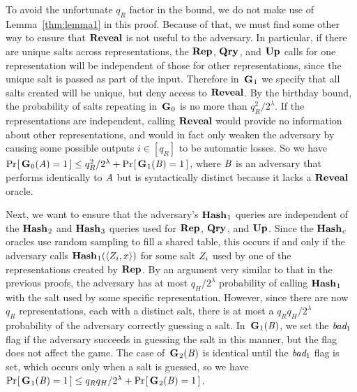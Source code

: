 To avoid the unfortunate $q_R$ factor in the bound, we do not make use of Lemma~\ref{thm:lemma1} in this proof. Because of that, we must find some other way to ensure that $\mathbf{Reveal}$ is not useful to the adversary. In particular, if there are unique salts across representations, the $\textup{\textbf{Rep}}\hspace{0.5pt}$, $\textup{\textbf{Qry}}\hspace{0.5pt}$, and $\textup{\textbf{Up}}\hspace{0.5pt}$ calls for one representation will be independent of those for other representations, since the unique salt is passed as part of the input. Therefore in~$\textup{\textbf{G}}\hspace{0.5pt}_1$ we specify that all salts created will be unique, but deny access to $\mathbf{Reveal}$. By the birthday bound, the probability of salts repeating in~$\textup{\textbf{G}}\hspace{0.5pt}_0$ is no more than $q_R^2/2^\lambda$. If the representations are independent, calling $\mathbf{Reveal}$ would provide no information about other representations, and would in fact only weaken the adversary by causing some possible outputs $i \in [q_R]$ to be automatic losses. So we have $\Pr\hspace{-1pt}\left[\,\textup{\textbf{G}}\hspace{0.5pt}_0(\mathit{A}) = 1\,\right] \le q_R^2/2^\lambda + \Pr\hspace{-1pt}\left[\,\textup{\textbf{G}}\hspace{0.5pt}_1(\mathit{B}) = 1\,\right]$, where $\mathit{B}$ is an adversary that performs identically to $\mathit{A}$ but is syntactically distinct because it lacks a $\mathbf{Reveal}$ oracle.

Next, we want to ensure that the adversary's $\textup{\textbf{Hash}}\hspace{0.5pt}_1$ queries are independent of the $\textup{\textbf{Hash}}\hspace{0.5pt}_2$ and $\textup{\textbf{Hash}}\hspace{0.5pt}_3$ queries used for $\textup{\textbf{Rep}}\hspace{0.5pt}$, $\textup{\textbf{Qry}}\hspace{0.5pt}$, and $\textup{\textbf{Up}}\hspace{0.5pt}$. Since the $\textup{\textbf{Hash}}\hspace{0.5pt}_c$ oracles use random sampling to fill a shared table, this occurs if and only if the adversary calls $\textup{\textbf{Hash}}\hspace{0.5pt}_1(\langle Z_i,x\rangle)$ for some salt $Z_i$ used by one of the representations created by $\textup{\textbf{Rep}}\hspace{0.5pt}$. By an argument very similar to that in the previous proofs, the adversary has at most $q_H/2^\lambda$ probability of calling $\textup{\textbf{Hash}}\hspace{0.5pt}_1$ with the salt used by some specific representation. However, since there are now $q_R$ representations, each with a distinct salt, there is at most a $q_Rq_H/2^\lambda$ probability of the adversary correctly guessing a salt. In~$\textup{\textbf{G}}\hspace{0.5pt}_1(\mathit{B})$, we set the $\textit{bad}_1$ flag if the adversary succeeds in guessing the salt in this manner, but the flag does not affect the game. The case of~$\textup{\textbf{G}}\hspace{0.5pt}_2(\mathit{B})$ is identical until the $\textit{bad}_1$ flag is set, which occurs only when a salt is guessed, so we have $\Pr\hspace{-1pt}\left[\,\textup{\textbf{G}}\hspace{0.5pt}_1(\mathit{B}) = 1\,\right] \le q_Rq_H/2^\lambda + \Pr\hspace{-1pt}\left[\,\textup{\textbf{G}}\hspace{0.5pt}_2(\mathit{B}) = 1\,\right]$.

